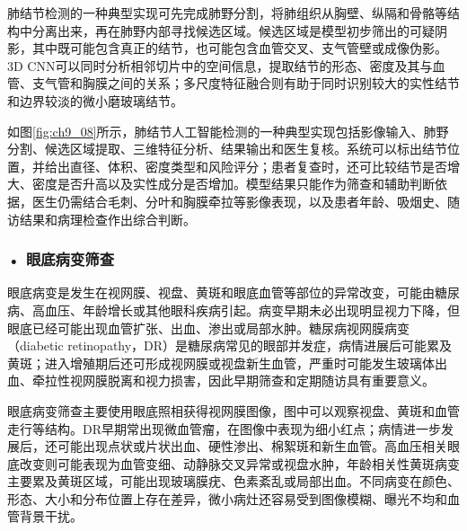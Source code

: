 肺结节检测的一种典型实现可先完成肺野分割，将肺组织从胸壁、纵隔和骨骼等结构中分离出来，再在肺野内部寻找候选区域。候选区域是模型初步筛出的可疑阴影，其中既可能包含真正的结节，也可能包含血管交叉、支气管壁或成像伪影。3D CNN可以同时分析相邻切片中的空间信息，提取结节的形态、密度及其与血管、支气管和胸膜之间的关系；多尺度特征融合则有助于同时识别较大的实性结节和边界较淡的微小磨玻璃结节。

如图\ref{fig:ch9_08}所示，肺结节人工智能检测的一种典型实现包括影像输入、肺野分割、候选区域提取、三维特征分析、结果输出和医生复核。系统可以标出结节位置，并给出直径、体积、密度类型和风险评分；患者复查时，还可比较结节是否增大、密度是否升高以及实性成分是否增加。模型结果只能作为筛查和辅助判断依据，医生仍需结合毛刺、分叶和胸膜牵拉等影像表现，以及患者年龄、吸烟史、随访结果和病理检查作出综合判断。

\par
\noindent\begin{minipage}{\textwidth}
\centering
{}
\label{fig:ch9_08}
\end{minipage}
\par

\subsubsection*{\textbf{• 眼底病变筛查}}

眼底病变是发生在视网膜、视盘、黄斑和眼底血管等部位的异常改变，可能由糖尿病、高血压、年龄增长或其他眼科疾病引起。病变早期未必出现明显视力下降，但眼底已经可能出现血管扩张、出血、渗出或局部水肿。糖尿病视网膜病变（diabetic retinopathy，DR）是糖尿病常见的眼部并发症，病情进展后可能累及黄斑；进入增殖期后还可形成视网膜或视盘新生血管，严重时可能发生玻璃体出血、牵拉性视网膜脱离和视力损害，因此早期筛查和定期随访具有重要意义\label{note:ch9-drscale}。

眼底病变筛查主要使用眼底照相获得视网膜图像，图中可以观察视盘、黄斑和血管走行等结构。DR早期常出现微血管瘤，在图像中表现为细小红点；病情进一步发展后，还可能出现点状或片状出血、硬性渗出、棉絮斑和新生血管。高血压相关眼底改变则可能表现为血管变细、动静脉交叉异常或视盘水肿，年龄相关性黄斑病变主要累及黄斑区域，可能出现玻璃膜疣、色素紊乱或局部出血。不同病变在颜色、形态、大小和分布位置上存在差异，微小病灶还容易受到图像模糊、曝光不均和血管背景干扰。

